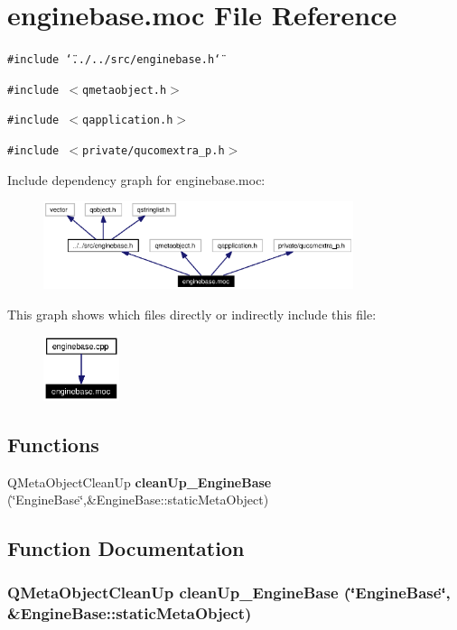\section{enginebase.moc File Reference}
\label{enginebase_8moc}


{\tt \#include \char`\"{}../../src/enginebase.h\char`\"{}}\par
{\tt \#include $<$qmetaobject.h$>$}\par
{\tt \#include $<$qapplication.h$>$}\par
{\tt \#include $<$private/qucomextra\_\-p.h$>$}\par


Include dependency graph for enginebase.moc:\begin{figure}[H]
\begin{center}
\leavevmode
\includegraphics[width=257pt]{enginebase_8moc__incl}
\end{center}
\end{figure}


This graph shows which files directly or indirectly include this file:\begin{figure}[H]
\begin{center}
\leavevmode
\includegraphics[width=63pt]{enginebase_8moc__dep__incl}
\end{center}
\end{figure}
\subsection*{Functions}
\begin{CompactItemize}
\item 
QMeta\-Object\-Clean\-Up {\bf clean\-Up\_\-Engine\-Base} (\char`\"{}Engine\-Base\char`\"{},\&Engine\-Base::static\-Meta\-Object)
\end{CompactItemize}


\subsection{Function Documentation}
\subsubsection{\setlength{\rightskip}{0pt plus 5cm}QMeta\-Object\-Clean\-Up clean\-Up\_\-Engine\-Base (\char`\"{}Engine\-Base\char`\"{}, \&Engine\-Base::static\-Meta\-Object)\hspace{0.3cm}{\tt  [static]}}\label{enginebase_8moc_a0}


